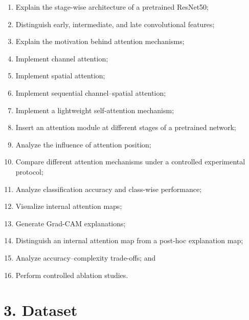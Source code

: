 \documentclass[10pt]{article}
\begin{document}
\begin{enumerate}

\item Explain the stage-wise architecture of a pretrained ResNet50;

\item Distinguish early, intermediate, and late convolutional features;

\item Explain the motivation behind attention mechanisms;

\item Implement channel attention;

\item Implement spatial attention;

\item Implement sequential channel--spatial attention;

\item Implement a lightweight self-attention mechanism;

\item Insert an attention module at different stages of a pretrained network;

\item Analyze the influence of attention position;

\item Compare different attention mechanisms under a controlled experimental
protocol;

\item Analyze classification accuracy and class-wise performance;

\item Visualize internal attention maps;

\item Generate Grad-CAM explanations;

\item Distinguish an internal attention map from a post-hoc explanation map;

\item Analyze accuracy--complexity trade-offs; and

\item Perform controlled ablation studies.

\end{enumerate}

\section*{3. Dataset}
\end{document}
